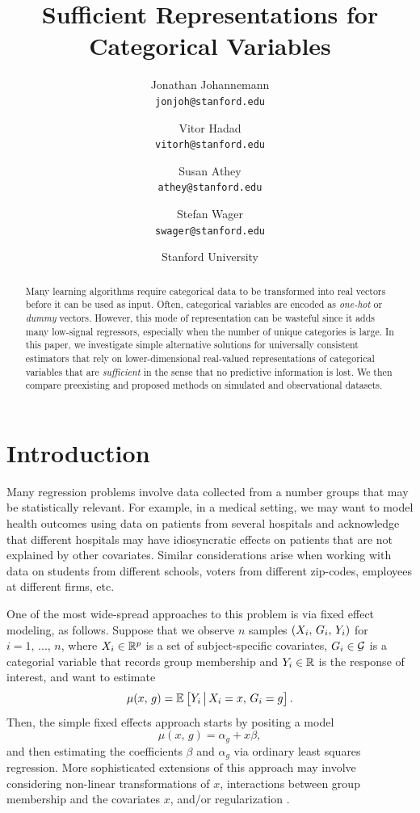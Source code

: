 \documentclass{article}
\author{Jonathan Johannemann \\ \texttt{jonjoh@stanford.edu}
\and Vitor Hadad \\ \texttt{vitorh@stanford.edu}
\and Susan Athey \\ \texttt{athey@stanford.edu}
\and Stefan Wager \\ \texttt{swager@stanford.edu}}
\date{Stanford University}
\title{Sufficient Representations for Categorical Variables}
\theoremstyle{plain}
\theoremstyle{definition}
\theoremstyle{remark}
\begin{document}
\maketitle

\begin{abstract}
    \noindent Many learning algorithms require categorical data to be transformed into real vectors before it can be used as input. Often, categorical variables are encoded as \emph{one-hot} or \emph{dummy} vectors. However, this mode of representation can be wasteful since it adds many low-signal regressors, especially when the number of unique categories is large.  In this paper, we investigate simple alternative solutions for universally consistent estimators that rely on lower-dimensional real-valued representations of categorical variables that are \emph{sufficient} in the sense that no predictive information is lost. We then compare preexisting and proposed methods on simulated and observational datasets.
\end{abstract}


\section{Introduction}

Many regression problems involve data collected from a number groups that may be statistically relevant.
For example, in a medical setting, we may want to model health outcomes using data on patients from
several hospitals and acknowledge that different hospitals may have idiosyncratic effects on patients
that are not explained by other covariates. Similar considerations arise when working with data on
students from different schools, voters from different zip-codes, employees at different firms, etc.

One of the most wide-spread approaches to this problem is via fixed effect modeling,
as follows. Suppose that we observe $n$ samples $\left(X_i, \, G_i, \, Y_i\right)$
for $i = 1, \, ..., \, n$, where $X_i \in \mathbb{R}^p$ is a set of subject-specific covariates, $G_i \in \mathcal{G}$ is a categorial variable that
records group membership and $Y_i \in \mathbb{R}$ is the response of interest, and want to estimate
\begin{equation}
\label{eq:mu}
\mu(x, \, g) = \mathbb{E}_{}\left[Y_i \,\big|\, X_i = x, \, G_i = g\right].
\end{equation}
Then, the simple fixed effects approach starts by positing a model
\begin{equation}
\label{eq:FE}
\mu(x, \, g) = \alpha_g + x\beta,
\end{equation}
and then estimating the coefficients $\beta$ and $\alpha_g$ via ordinary least squares regression.
More sophisticated extensions of this approach may involve considering non-linear transformations
of $x$, interactions between group membership and the covariates $x$, and/or regularization
\citep{angrist2008mostly,diggle2002analysis,wooldridge2010econometric}.
\end{document}
